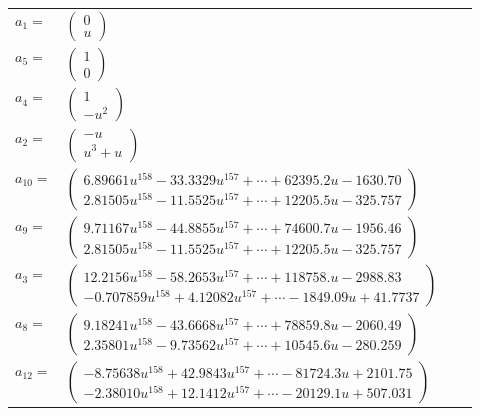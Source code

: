 \documentclass[1p]{elsarticle_modified}
\theoremstyle{definition}
\begin{document}
\begin{tabular}{m{7pt} m{180pt} m{7pt} m{180pt} }
\flushright $a_{1}=$&$\begin{pmatrix}0\\u\end{pmatrix}$ \\
\flushright $a_{5}=$&$\begin{pmatrix}1\\0\end{pmatrix}$ \\
\flushright $a_{4}=$&$\begin{pmatrix}1\\- u^2\end{pmatrix}$ \\
\flushright $a_{2}=$&$\begin{pmatrix}- u\\u^3+u\end{pmatrix}$ \\
\flushright $a_{10}=$&$\begin{pmatrix}6.89661 u^{158}-33.3329 u^{157}+\cdots+62395.2 u-1630.70\\2.81505 u^{158}-11.5525 u^{157}+\cdots+12205.5 u-325.757\end{pmatrix}$ \\
\flushright $a_{9}=$&$\begin{pmatrix}9.71167 u^{158}-44.8855 u^{157}+\cdots+74600.7 u-1956.46\\2.81505 u^{158}-11.5525 u^{157}+\cdots+12205.5 u-325.757\end{pmatrix}$ \\
\flushright $a_{3}=$&$\begin{pmatrix}12.2156 u^{158}-58.2653 u^{157}+\cdots+118758. u-2988.83\\-0.707859 u^{158}+4.12082 u^{157}+\cdots-1849.09 u+41.7737\end{pmatrix}$ \\
\flushright $a_{8}=$&$\begin{pmatrix}9.18241 u^{158}-43.6668 u^{157}+\cdots+78859.8 u-2060.49\\2.35801 u^{158}-9.73562 u^{157}+\cdots+10545.6 u-280.259\end{pmatrix}$ \\
\flushright $a_{12}=$&$\begin{pmatrix}-8.75638 u^{158}+42.9843 u^{157}+\cdots-81724.3 u+2101.75\\-2.38010 u^{158}+12.1412 u^{157}+\cdots-20129.1 u+507.031\end{pmatrix}$ \\

\end{tabular}
\end{document}

